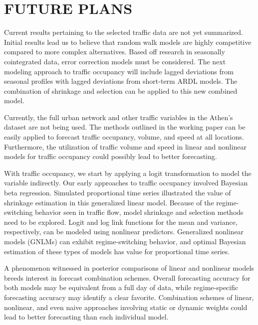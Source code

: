 \section{FUTURE PLANS}

Current results pertaining to the selected traffic data are not yet summarized. Initial results lead us to believe that random walk models are highly competitive compared to more complex alternatives. Based off research in seasonally cointegrated data, error correction models must be considered. The next modeling approach to traffic occupancy will include lagged deviations from seasonal profiles with lagged deviations from short-term ARDL models. The combination of shrinkage and selection can be applied to this new combined model. 

Currently, the full urban network and other traffic variables in the Athen's dataset are not being used. The methods outlined in the working paper can be easily applied to forecast traffic occupancy, volume, and speed at all locations. Furthermore, the utilization of traffic volume and speed in linear and nonlinear models for traffic occupancy could possibly lead to better forecasting. 

With traffic occupancy, we start by applying a logit transformation to model the variable indirectly. Our early approaches to traffic occupancy involved Bayesian beta regression. Simulated proportional time series  illustrated the value of shrinkage estimation in this generalized linear model. Because of the regime-switching behavior seen in traffic flow, model shrinkage and selection methods need to be explored. Logit and log link functions for the mean and variance, respectively, can be modeled using nonlinear predictors. Generalized nonlinear models (GNLMs) can exhibit regime-switching behavior, and optimal Bayesian estimation of these types of models has value for proportional time series.

A phenomenon witnessed in posterior comparisons of linear and nonlinear models breeds interest in forecast combination schemes. Overall forecasting accuracy for both models may be equivalent from a full day of data, while regime-specific forecasting accuracy may identify a clear favorite. Combination schemes of linear, nonlinear, and even naive approaches involving static or dynamic weights could lead to better forecasting than each individual model. 
